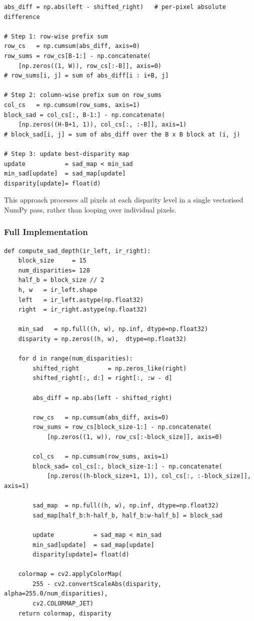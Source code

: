 \documentclass[12pt, a4paper]{article}
\begin{document}
\begin{lstlisting}[caption={Cumulative-sum block matching (live\_stream.py lines 99--116)}]
abs_diff = np.abs(left - shifted_right)   # per-pixel absolute difference

# Step 1: row-wise prefix sum
row_cs   = np.cumsum(abs_diff, axis=0)
row_sums = row_cs[B-1:] - np.concatenate(
    [np.zeros((1, W)), row_cs[:-B]], axis=0)
# row_sums[i, j] = sum of abs_diff[i : i+B, j]

# Step 2: column-wise prefix sum on row_sums
col_cs   = np.cumsum(row_sums, axis=1)
block_sad = col_cs[:, B-1:] - np.concatenate(
    [np.zeros((H-B+1, 1)), col_cs[:, :-B]], axis=1)
# block_sad[i, j] = sum of abs_diff over the B x B block at (i, j)

# Step 3: update best-disparity map
update           = sad_map < min_sad
min_sad[update]  = sad_map[update]
disparity[update]= float(d)
\end{lstlisting}

This approach processes all pixels at each disparity level in a single
vectorised NumPy pass, rather than looping over individual pixels.

\subsubsection{Full Implementation}

\begin{lstlisting}[caption={Complete SAD depth computation (live\_stream.py lines 79--121)}]
def compute_sad_depth(ir_left, ir_right):
    block_size     = 15
    num_disparities= 128
    half_b = block_size // 2
    h, w   = ir_left.shape
    left   = ir_left.astype(np.float32)
    right  = ir_right.astype(np.float32)

    min_sad   = np.full((h, w), np.inf, dtype=np.float32)
    disparity = np.zeros((h, w),  dtype=np.float32)

    for d in range(num_disparities):
        shifted_right        = np.zeros_like(right)
        shifted_right[:, d:] = right[:, :w - d]

        abs_diff = np.abs(left - shifted_right)

        row_cs   = np.cumsum(abs_diff, axis=0)
        row_sums = row_cs[block_size-1:] - np.concatenate(
            [np.zeros((1, w)), row_cs[:-block_size]], axis=0)

        col_cs   = np.cumsum(row_sums, axis=1)
        block_sad= col_cs[:, block_size-1:] - np.concatenate(
            [np.zeros((h-block_size+1, 1)), col_cs[:, :-block_size]], axis=1)

        sad_map  = np.full((h, w), np.inf, dtype=np.float32)
        sad_map[half_b:h-half_b, half_b:w-half_b] = block_sad

        update           = sad_map < min_sad
        min_sad[update]  = sad_map[update]
        disparity[update]= float(d)

    colormap = cv2.applyColorMap(
        255 - cv2.convertScaleAbs(disparity, alpha=255.0/num_disparities),
        cv2.COLORMAP_JET)
    return colormap, disparity
\end{lstlisting}
\end{document}
